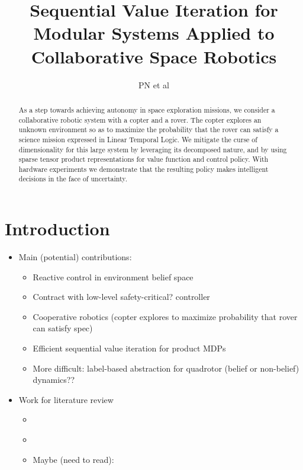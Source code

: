 \documentclass[conference]{IEEEtran}
\begin{document}
\title{\huge Sequential Value Iteration for Modular Systems Applied to Collaborative Space Robotics}

\author{PN et al}

\maketitle

\begin{abstract}
  As a step towards achieving autonomy in space exploration missions, we consider a collaborative robotic system with a copter and a rover. The copter explores an unknown environment so as to maximize the probability that the rover can satisfy a science mission expressed in Linear Temporal Logic. We mitigate the curse of dimensionality for this large system by leveraging its decomposed nature, and by using sparse tensor product representations for value function and control policy. With hardware experiments we demonstrate that the resulting policy makes intelligent decisions in the face of uncertainty.
\end{abstract}

\IEEEpeerreviewmaketitle

	

\section{Introduction}

\begin{itemize}
  \item Main (potential) contributions:
  \begin{itemize}
    \item Reactive control in environment belief space
    \item Contract with low-level safety-critical? controller
    \item Cooperative robotics (copter explores to maximize probability that rover can satisfy spec)
    \item Efficient sequential value iteration for product MDPs
    \item More difficult: label-based abstraction for quadrotor (belief or non-belief) dynamics?? 
  \end{itemize}
\end{itemize}

\begin{itemize}
  \item Work for literature review
  \begin{itemize}
    \item \cite{Papusha2016}
    \item \cite{Alora2016}
    \item Maybe (need to read): \cite{Lavaei2017}
  \end{itemize}
\end{itemize}
\end{document}
